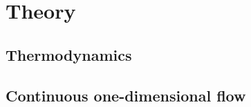\section{Theory}
\begin{multicols}{2}
\subsection*{Thermodynamics}


\subsection*{Continuous one-dimensional flow}

\end{multicols}
